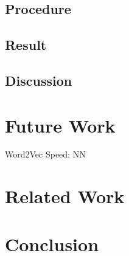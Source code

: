 \documentclass[PRO,english]{ipsj}
\begin{document}
\subsection{Procedure}

\subsection{Result}

\subsection{Discussion}

\section{Future Work}
Word2Vec
Speed: NN

\section{Related Work}

\section{Conclusion}
\end{document}
